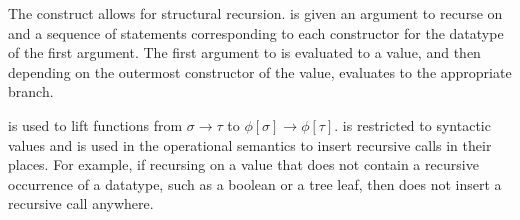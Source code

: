 The  construct allows for structural recursion.   is given an
argument to recurse on and a sequence of statements corresponding to each
constructor for the datatype of the first argument.  The first argument to
 is evaluated to a value, and then depending on the outermost
constructor of the value,  evaluates to the appropriate branch.


 is used to lift functions from $\sigma \rightarrow \tau$ to
$\phi[\sigma] \rightarrow \phi[\tau]$.  is restricted to syntactic
values and is used in the operational semantics to insert recursive calls in
their places. For example, if recursing on a value that does not contain a
recursive occurrence of a datatype, such as a boolean or a tree leaf, then
 does not insert a recursive call anywhere.


